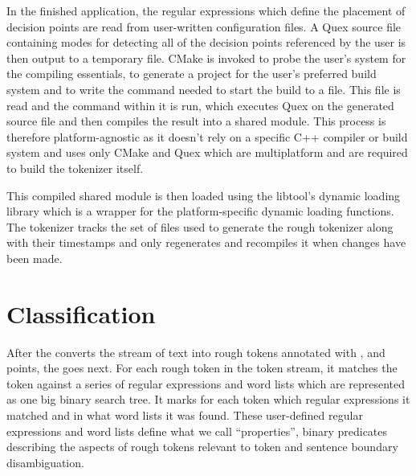 In the finished application, the regular expressions which define the placement
of decision points are read from user-written configuration files. A Quex
source file containing modes for detecting all of the decision points
referenced by the user is then output to a temporary file. CMake
\cite{web-cmake} is invoked to probe the user's system for the compiling
essentials, to generate a project for the user's preferred build system and to
write the command needed to start the build to a file. This file is read and
the command within it is run, which executes Quex on the generated source file
and then compiles the result into a shared module. This process is therefore
platform-agnostic as it doesn't rely on a specific C++ compiler or build system
and uses only CMake and Quex which are multiplatform and are required to build
the tokenizer itself.

This compiled shared module is then loaded using the libtool's dynamic loading
library \cite{web-libtool} which is a wrapper for the platform-specific dynamic
loading functions. The tokenizer tracks the set of files used to generate the
rough tokenizer along with their timestamps and only regenerates and recompiles
it when changes have been made.

\section{Classification}

After the  converts the stream of text into rough tokens
annotated with \maysplit{}, \mayjoin{} and \maybreaksentence{} points, the
 goes next. For each rough token in the token stream,
it matches the token against a series of regular expressions and word lists
which are represented as one big binary search tree. It marks for each token
which regular expressions it matched and in what word lists it was found. These
user-defined regular expressions and word lists define what we call
``properties'', binary predicates describing the aspects of rough tokens
relevant to token and sentence boundary disambiguation.

